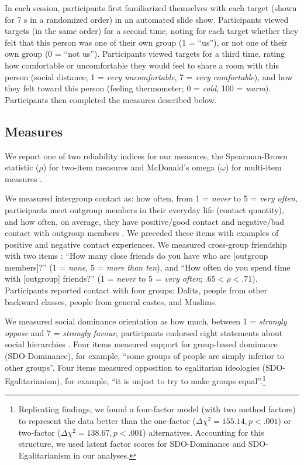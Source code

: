 \documentclass[12pt, a4paper]{article}
\begin{document}
In each session, participants first familiarized themselves with each target (shown for 7 s in a randomized order) in an automated slide show. Participants viewed targets (in the same order) for a second time, noting for each target whether they felt that this person was one of their own group (1 = “us”), or not one of their own group (0 = “not us”). Participants viewed targets for a third time, rating how comfortable or uncomfortable they would feel to share a room with this person (social distance; 1 = \textit{very uncomfortable}, 7 = \textit{very comfortable}), and how they felt toward this person (feeling thermometer; 0 = \textit{cold}, 100 = \textit{warm}). Participants then completed the measures described below.

\subsection{Measures}

We report one of two reliability indices for our measures, the Spearman-Brown statistic ($\rho$) for two-item measures \parencite{eisinga_reliability_2013} and McDonald’s omega ($\omega$) for multi-item measures \parencite{dunn_alpha_2014}.

We measured intergroup contact as: how often, from 1 = \textit{never} to 5 = \textit{very often,} participants meet outgroup members in their everyday life (contact quantity), and how often, on average, they have positive/good contact and negative/bad contact with outgroup members \parencite{barlow_contact_2012}. We preceded these items with examples of positive and negative contact experiences. We measured cross-group friendship with two items \parencite{turner_reducing_2007}: “How many close friends do you have who are [outgroup members]?” (1 = \textit{none}, 5 = \textit{more than ten}), and “How often do you spend time with [outgroup] friends?” (1 = \textit{never} to 5 = \textit{very often}; $.65 < \rho < .71$). Participants reported contact with four groups: Dalits, people from other backward classes, people from general castes, and Muslims.

We measured social dominance orientation as how much, between 1 = \textit{strongly oppose }and 7 = \textit{strongly favour}, participants endorsed eight statements about social hierarchies \parencite{ho_nature_2015}. Four items measured support for group-based dominance (SDO-Dominance), for example, “some groups of people are simply inferior to other groups”. Four items measured opposition to egalitarian ideologies (SDO-Egalitarianism), for example, “it is unjust to try to make groups equal”.\footnote{Replicating \protect\textcite['s][]{ho_nature_2015} findings, we found a four-factor model (with two method factors) to represent the data better than the one-factor ($\Delta\chi^2 = 155.14, p < .001$) or two-factor ($\Delta\chi^2 = 138.67, p < .001$) alternatives. Accounting for this structure, we used latent factor scores for SDO-Dominance and SDO-Egalitarianism in our analyses.}
\end{document}

